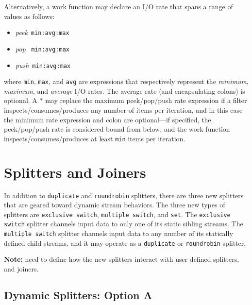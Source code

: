 \documentclass{tr}
\begin{document}
Alternatively, a  work function may declare  an I/O rate  that spans a
range of values as follows:
\begin{itemize}
\item {\it peek}~\texttt{min:avg:max}
\item {\it pop }~\texttt{min:avg:max}
\item {\it push}~\texttt{min:avg:max}
\end{itemize}
where  \texttt{min}, \texttt{max},  and  \texttt{avg} are  expressions
that respectively represent the {\it minimum}, {\it maximum}, and {\it
average} I/O  rates.  The average  rate (and encapsulating  colons) is
optional.  A $*$ may replace the maximum peek/pop/push rate expression
if  a  filter  inspects/consumes/produces  any  number  of  items  per
iteration, and in this case  the minimum rate expression and colon are
optional---if  specified, the peek/pop/push  rate is  considered bound
from below, and the  work function inspects/consumes/produces at least
\texttt{min} items per iteration.


\section{Splitters and Joiners}

In addition  to \texttt{duplicate} and  \texttt{roundrobin} splitters,
there are  three new splitters  that are geared toward  dynamic stream
behaviors.   The three  new types  of splitters  are \texttt{exclusive
switch},    \texttt{multiple   switch},    and    \texttt{set}.    The
\texttt{exclusive switch} splitter channels  input data to only one of
its  static  sibling streams.  The  \texttt{multiple switch}  splitter
channels  input data  to any  number of  its statically  defined child
streams,   and   it   may   operate   as   a   \texttt{duplicate}   or
\texttt{roundrobin} splitter.

{\bf Note:}  need to define how  the new splitters  interact with user
defined splitters, and joiners.


\subsection{Dynamic Splitters:  Option A}
\end{document}
